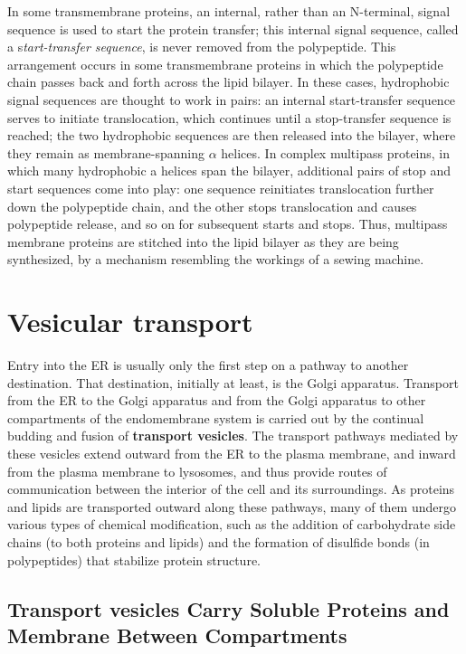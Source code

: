 In some transmembrane proteins, an internal, rather than an N-terminal,
signal sequence is used to start the protein transfer; this internal signal 
sequence, called a s\textit{tart-transfer sequence}, is never removed from
the polypeptide. This arrangement occurs in some transmembrane proteins 
in which the polypeptide chain passes back and forth across the
lipid bilayer. In these cases, hydrophobic signal sequences are thought
to work in pairs: an internal start-transfer sequence serves to initiate
translocation, which continues until a stop-transfer sequence is reached;
the two hydrophobic sequences are then released into the bilayer, where
they remain as membrane-spanning $\alpha$ helices.
In complex multipass proteins, in which many hydrophobic a helices span the
bilayer, additional pairs of stop and start sequences come into play:
one sequence reinitiates translocation further down the polypeptide chain,
and the other stops translocation and causes polypeptide release, and
so on for subsequent starts and stops. Thus, multipass membrane proteins 
are stitched into the lipid bilayer as they are being synthesized, by a
mechanism resembling the workings of a sewing machine.

\section{Vesicular transport}

Entry into the ER is usually only the first step on a pathway to another
destination. That destination, initially at least, is the Golgi apparatus.
Transport from the ER to the Golgi apparatus and from the Golgi apparatus 
to other compartments of the endomembrane system is carried out
by the continual budding and fusion of \textbf{transport vesicles}. The transport
pathways mediated by these vesicles extend outward from the ER to the
plasma membrane, and inward from the plasma membrane to lysosomes,
and thus provide routes of communication between the interior of the
cell and its surroundings. As proteins and lipids are transported outward
along these pathways, many of them undergo various types of chemical
modification, such as the addition of carbohydrate side chains (to both
proteins and lipids) and the formation of disulfide bonds (in polypeptides)
that stabilize protein structure.

\subsection{Transport vesicles Carry Soluble Proteins and Membrane Between Compartments}

